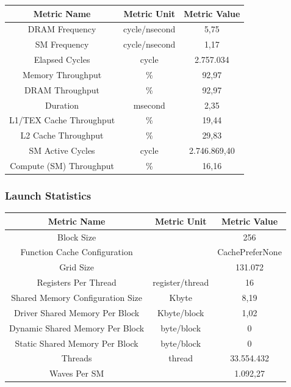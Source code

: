 \documentclass[a4paper, 12pt, oneside]{article}
\begin{document}
\begin{center}
  \begin{tabular}{ |c|c|c| }
    \hline
    Metric Name             & Metric Unit   & Metric Value \\
    \hline
    DRAM Frequency          & cycle/nsecond & 5,75         \\
    SM Frequency            & cycle/nsecond & 1,17         \\
    Elapsed Cycles          & cycle         & 2.757.034    \\
    Memory Throughput       & \%            & 92,97        \\
    DRAM Throughput         & \%            & 92,97        \\
    Duration                & msecond       & 2,35         \\
    L1/TEX Cache Throughput & \%            & 19,44        \\
    L2 Cache Throughput     & \%            & 29,83        \\
    SM Active Cycles        & cycle         & 2.746.869,40 \\
    Compute (SM) Throughput & \%            & 16,16        \\
    \hline
  \end{tabular}
\end{center}

\subsubsection{Launch Statistics}

\begin{center}
  \begin{tabular}{ |c|c|c| }
    \hline
    Metric Name                      & Metric Unit     & Metric Value    \\
    \hline
    Block Size                       &                 & 256             \\
    Function Cache Configuration     &                 & CachePreferNone \\
    Grid Size                        &                 & 131.072         \\
    Registers Per Thread             & register/thread & 16              \\
    Shared Memory Configuration Size & Kbyte           & 8,19            \\
    Driver Shared Memory Per Block   & Kbyte/block     & 1,02            \\
    Dynamic Shared Memory Per Block  & byte/block      & 0               \\
    Static Shared Memory Per Block   & byte/block      & 0               \\
    Threads                          & thread          & 33.554.432      \\
    Waves Per SM                     &                 & 1.092,27        \\
    \hline
  \end{tabular}
\end{center}
\end{document}
